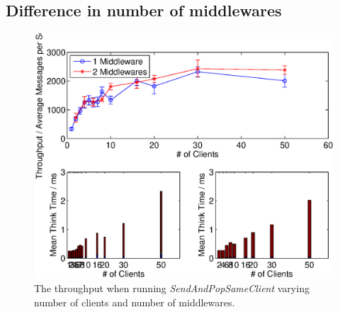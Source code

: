 \documentclass{article}
\begin{document}
        \subsection{Difference in number of middlewares}
            \begin{figure}[H]
                \hspace{-2.5cm}
                \includegraphics[scale=0.60]{throughout_middleware_clients}
                \caption{The throughput when running \textit{SendAndPopSameClient} varying number of clients and number of middlewares.}
                \label{fig:throughput_middleware_clients}
                \end{figure}
            
\end{document}
